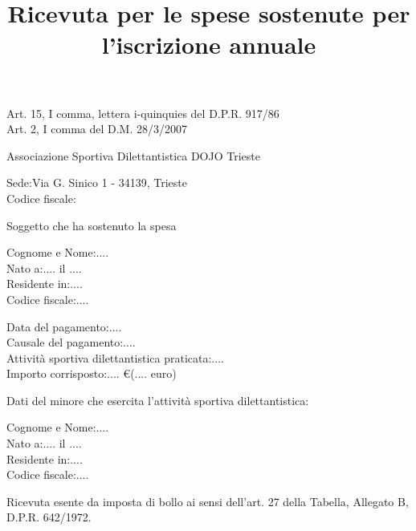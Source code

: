 \documentclass{djtsdoc}
\title{Ricevuta per le spese sostenute per l'iscrizione annuale}
\date{}
\begin{document}
	\maketitle
	
	\fontsize{11pt}{14pt}\selectfont
	
	\begin{center}
		Art. 15, I comma, lettera i-quinquies del D.P.R. 917/86\\
		Art. 2, I comma del D.M. 28/3/2007
	\end{center}
	\vspace{0.4in}
	
	Associazione Sportiva Dilettantistica DOJO Trieste
	\begin{adjustwidth}{0.5in}{0pt}
		Sede:\quad Via G. Sinico 1 - 34139, Trieste \\
		Codice fiscale:
	\end{adjustwidth}
	\vspace{0.2in}
	
	Soggetto che ha sostenuto la spesa
	\begin{adjustwidth}{0.5in}{0pt}
		Cognome e Nome:\quad .... \\
		Nato a:\quad .... il .... \\
		Residente in:\quad .... \\
		Codice fiscale:\quad ....
	\end{adjustwidth}
	\vspace{0.4in}
	
	Data del pagamento:\quad .... \\[10pt]
	Causale del pagamento:\quad .... \\[10pt]
	Attività sportiva dilettantistica praticata:\quad .... \\[10pt]
	Importo corrisposto:\quad .... €\quad (.... euro)
	\vspace{0.4in}
	
	Dati del minore che esercita l'attività sportiva dilettantistica:
	\begin{adjustwidth}{0.5in}{0pt}
		Cognome e Nome:\quad .... \\
		Nato a:\quad .... il .... \\
		Residente in:\quad .... \\
		Codice fiscale:\quad ....
	\end{adjustwidth}
	\vspace{0.5in}
	
	\begin{flushright}
	\end{flushright}
	\vspace{0.8in}
	
	\begin{center}
		Ricevuta esente da imposta di bollo ai sensi dell'art. 27 della Tabella, Allegato B, D.P.R. 642/1972.
	\end{center}
	
\end{document}
